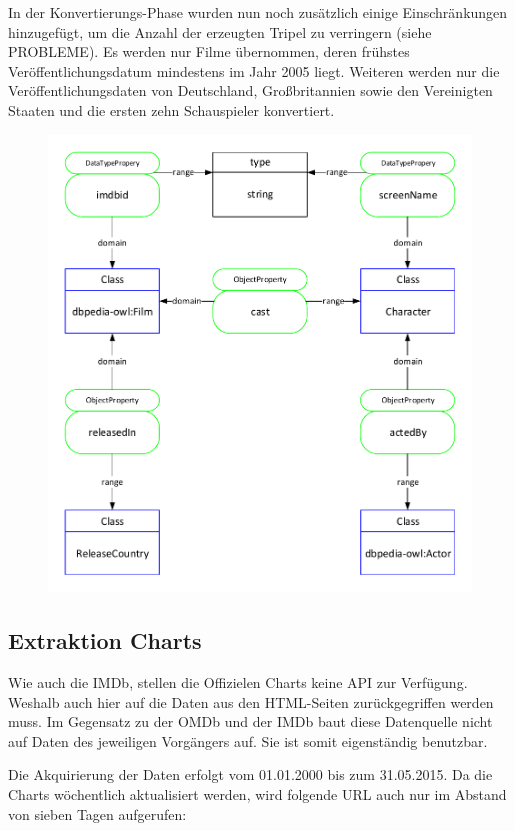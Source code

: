 \documentclass[parskip]{scrartcl}
\begin{document}
In der Konvertierungs-Phase wurden nun noch zusätzlich einige Einschränkungen hinzugefügt, um die Anzahl der erzeugten Tripel zu verringern (siehe PROBLEME). Es werden nur Filme übernommen, deren frühstes Veröffentlichungsdatum mindestens im Jahr 2005 liegt. Weiteren werden nur die Veröffentlichungsdaten von Deutschland, Großbritannien sowie den Vereinigten Staaten und die ersten zehn Schauspieler konvertiert.



\begin{figure}[htbp]
    \centering
    \includegraphics[scale=0.8]{imdb}
\end{figure}

\subsection{Extraktion Charts}

Wie auch die IMDb, stellen die Offizielen Charts keine API zur Verfügung. Weshalb auch hier auf die Daten aus den HTML-Seiten zurückgegriffen werden muss. Im Gegensatz zu der OMDb und der IMDb baut diese Datenquelle nicht auf Daten des jeweiligen Vorgängers auf. Sie ist somit eigenständig benutzbar.

Die Akquirierung der Daten erfolgt vom 01.01.2000 bis zum 31.05.2015. Da die Charts wöchentlich aktualisiert werden, wird folgende URL auch nur im Abstand von sieben Tagen aufgerufen:
\end{document}

